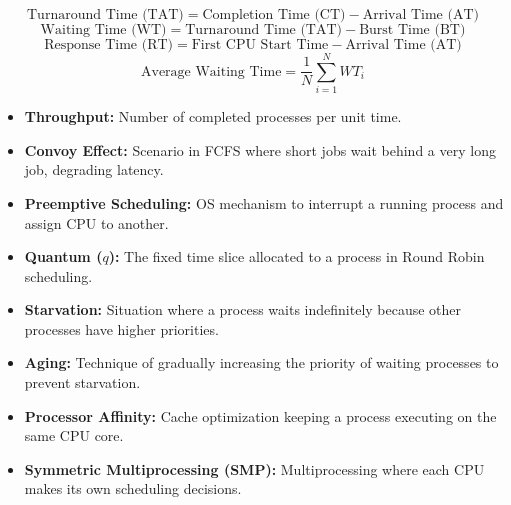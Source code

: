 \documentclass[12pt,a4paper]{article}
\begin{document}
\begin{tcolorbox}[formulabox, title={\textbf{Core Scheduling Formulas}}]
$$\text{Turnaround Time (TAT)} = \text{Completion Time (CT)} - \text{Arrival Time (AT)}$$
$$\text{Waiting Time (WT)} = \text{Turnaround Time (TAT)} - \text{Burst Time (BT)}$$
$$\text{Response Time (RT)} = \text{First CPU Start Time} - \text{Arrival Time (AT)}$$
$$\text{Average Waiting Time} = \frac{1}{N}\sum_{i=1}^{N} WT_i$$
\end{tcolorbox}

\begin{tcolorbox}[defbox, title={\textbf{One-Line Definitions}}]
\begin{itemize}[leftmargin=*, itemsep=2.5pt, topsep=0pt]
  \item \textbf{Throughput:} Number of completed processes per unit time.
  \item \textbf{Convoy Effect:} Scenario in FCFS where short jobs wait behind a very long job, degrading latency.
  \item \textbf{Preemptive Scheduling:} OS mechanism to interrupt a running process and assign CPU to another.
  \item \textbf{Quantum ($q$):} The fixed time slice allocated to a process in Round Robin scheduling.
  \item \textbf{Starvation:} Situation where a process waits indefinitely because other processes have higher priorities.
  \item \textbf{Aging:} Technique of gradually increasing the priority of waiting processes to prevent starvation.
  \item \textbf{Processor Affinity:} Cache optimization keeping a process executing on the same CPU core.
  \item \textbf{Symmetric Multiprocessing (SMP):} Multiprocessing where each CPU makes its own scheduling decisions.
\end{itemize}
\end{tcolorbox}
\end{document}

